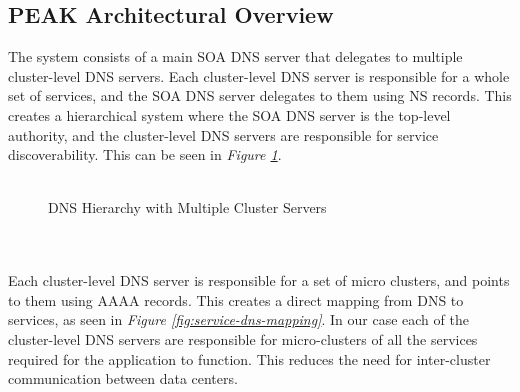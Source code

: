 \documentclass[12pt]{article}
\begin{document}
\subsection{PEAK Architectural Overview}
The system consists of a main SOA DNS server that delegates to multiple cluster-level DNS servers.
Each cluster-level DNS server is responsible for a whole set of services, and the SOA DNS server delegates to them using NS records.
This creates a hierarchical system where the SOA DNS server is the top-level authority, and the cluster-level DNS servers are responsible for service discoverability.
This can be seen in \textit{Figure \ref{fig:dns-hierarchy}}.
\\
\\
\begin{figure}[h]
    \centering
    \caption{DNS Hierarchy with Multiple Cluster Servers}
    \label{fig:dns-hierarchy}
\end{figure}
\\
\\
Each cluster-level DNS server is responsible for a set of micro clusters, and points to them using AAAA records.
This creates a direct mapping from DNS to services, as seen in \textit{Figure \ref{fig:service-dns-mapping}}.
In our case each of the cluster-level DNS servers are responsible for micro-clusters of all the services required 
for the application to function. This reduces the need for inter-cluster communication between data centers.
\end{document}
